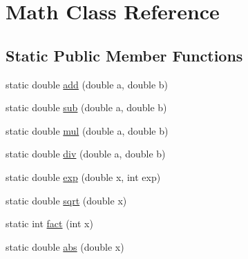 \hypertarget{classMath}{\section{Math Class Reference}
\label{classMath}
}
\subsection*{Static Public Member Functions}
\begin{DoxyCompactItemize}
\item 
static double \hyperlink{classMath_ac9774c99a4f12bb928f1d59483a62f55}{add} (double a, double b)
\item 
static double \hyperlink{classMath_a6b48894bada3b49a788dd9050bbe29ee}{sub} (double a, double b)
\item 
static double \hyperlink{classMath_a2960dd27ba97e81da9b99e4f3de9231f}{mul} (double a, double b)
\item 
static double \hyperlink{classMath_aa8d168d849ae9be946f5d8ec2d0db39e}{div} (double a, double b)
\item 
static double \hyperlink{classMath_a1f660660916446dd095fe40cfaaccd45}{exp} (double x, int exp)
\item 
static double \hyperlink{classMath_a79979f796703a578f12c95517812466e}{sqrt} (double x)
\item 
static int \hyperlink{classMath_a88c1cd28a6edb1959d062fc477d61d31}{fact} (int x)
\item 
static double \hyperlink{classMath_a496de1930a0299faa8d40d681ef4301e}{abs} (double x)
\end{DoxyCompactItemize}


